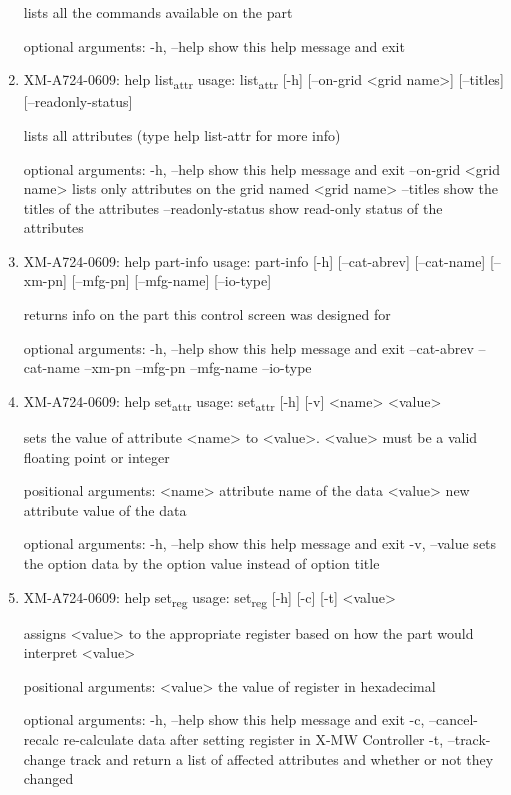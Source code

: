 \documentclass[11pt]{article}
\begin{document}
\begin{enumerate}
lists all the commands available on the part

optional arguments:
  -h, --help  show this help message and exit

\item XM-A724-0609: help list\textsubscript{attr}
\label{sec:org7ec3b38}
usage: list\textsubscript{attr} [-h] [--on-grid <grid name>] [--titles] [--readonly-status]

lists all attributes (type help list-attr for more info)

optional arguments:
  -h, --help            show this help message and exit
  --on-grid <grid name>
                        lists only attributes on the grid named <grid name>
  --titles              show the titles of the attributes
  --readonly-status     show read-only status of the attributes

\item XM-A724-0609: help part-info
\label{sec:org5e47dcb}
usage: part-info  [-h] [--cat-abrev] [--cat-name] [--xm-pn] [--mfg-pn] [--mfg-name]
        [--io-type]

returns info on the part this control screen was designed for

optional arguments:
  -h, --help   show this help message and exit
  --cat-abrev
  --cat-name
  --xm-pn
  --mfg-pn
  --mfg-name
  --io-type

\item XM-A724-0609: help set\textsubscript{attr}
\label{sec:orgbe6ba47}
usage: set\textsubscript{attr} [-h] [-v] <name> <value>

sets the value of attribute <name> to <value>. <value> must be a valid
floating point or integer

positional arguments:
  <name>       attribute name of the data
  <value>      new attribute value of the data

optional arguments:
  -h, --help   show this help message and exit
  -v, --value  sets the option data by the option value instead of option
               title

\item XM-A724-0609: help set\textsubscript{reg}
\label{sec:orgc3d8746}
usage: set\textsubscript{reg} [-h] [-c] [-t] <value>

assigns <value> to the appropriate register based on how the part would
interpret <value>

positional arguments:
  <value>              the value of register in hexadecimal

optional arguments:
  -h, --help           show this help message and exit
  -c, --cancel-recalc  re-calculate data after setting register in X-MW
                       Controller
  -t, --track-change   track and return a list of affected attributes and
                       whether or not they changed


\end{enumerate}
\end{document}
